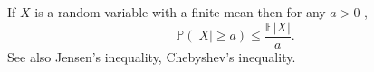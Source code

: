 If  $ X $  is a random variable with a finite mean then for any
 $ a>0 $ ,
 \[ \mathbb{P}(|X| \geq a)  \leq  \frac{ \mathbb{E} |X|}{a}. \]
See also Jensen's inequality, Chebyshev's inequality.


